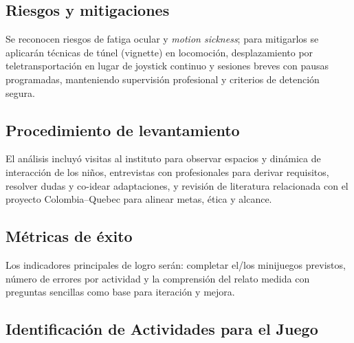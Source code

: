 \subsection{Riesgos y mitigaciones}
Se reconocen riesgos de fatiga ocular y \textit{motion sickness}; para mitigarlos se aplicarán 
técnicas de túnel (vignette) en locomoción, desplazamiento por teletransportación en lugar de 
joystick continuo y sesiones breves con pausas programadas, manteniendo supervisión profesional 
y criterios de detención segura.

\subsection{Procedimiento de levantamiento}
El análisis incluyó visitas al instituto para observar espacios y dinámica de interacción de los niños, 
entrevistas con profesionales para derivar requisitos, resolver dudas y co-idear adaptaciones, y 
revisión de literatura relacionada con el proyecto Colombia–Quebec para alinear metas, ética y alcance.%

\subsection{Métricas de éxito}
Los indicadores principales de logro serán: completar el/los minijuegos previstos, 
número de errores por actividad y la comprensión del relato medida con preguntas sencillas como base para iteración y mejora.%

\subsection{Identificación de Actividades para el Juego} \label{sec:actividades-juego}

